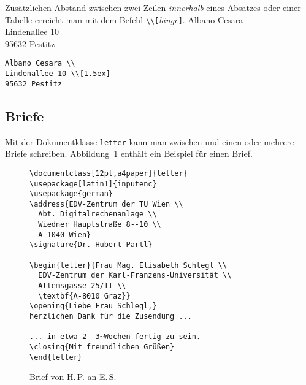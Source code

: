 Zusätzlichen Abstand zwischen zwei Zeilen \emph{innerhalb}
eines Absatzes oder einer Tabelle erreicht man mit dem Befehl
\verb|\\[|\textit{länge}\verb|]|.
\exa
Albano Cesara \\
Lindenallee 10 \\[1.5ex]
95632 Pestitz
\exb
\begin{verbatim}
Albano Cesara \\
Lindenallee 10 \\[1.5ex]
95632 Pestitz
\end{verbatim}
\exc

\smallskip
 
 
\subsection{Briefe}\label{briefe}
 

Mit der Dokumentklasse \texttt{letter} kann man zwischen
\verb|| und \verb|| einen oder
mehrere Briefe schreiben.
Abbildung~\ref{brief} enthält ein Beispiel für einen Brief.

\begin{figure}[ht] %
\begin{lminipage}{11cm}
\begin{verbatim}
\documentclass[12pt,a4paper]{letter}
\usepackage[latin1]{inputenc}
\usepackage{german}
\address{EDV-Zentrum der TU Wien \\
  Abt. Digitalrechenanlage \\
  Wiedner Hauptstraße 8--10 \\
  A-1040 Wien}
\signature{Dr. Hubert Partl}

\begin{letter}{Frau Mag. Elisabeth Schlegl \\
  EDV-Zentrum der Karl-Franzens-Universität \\
  Attemsgasse 25/II \\
  \textbf{A-8010 Graz}}
\opening{Liebe Frau Schlegl,}
herzlichen Dank für die Zusendung ...

... in etwa 2--3~Wochen fertig zu sein.
\closing{Mit freundlichen Grüßen}
\end{letter}

\end{verbatim}
\end{lminipage}
\caption{Brief von H.\,P. an E.\,S.} \label{brief}
\end{figure}

